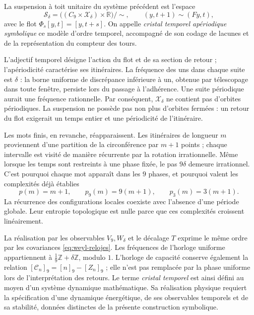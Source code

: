 \begin{definition}
\label{mono-ampl:def-cristal}
La suspension à toit unitaire du système précédent est l'espace
\[
 \mathcal S_\delta=
 \bigl((C_9\times\mathcal X_\delta)\times\mathbb R\bigr)/\sim,
 \qquad (y,t+1)\sim(Fy,t),
\]
avec le flot \(\Phi_s[y,t]=[y,t+s]\). On appelle \emph{cristal temporel
apériodique symbolique} ce modèle d'ordre temporel, accompagné de son
codage de lacunes et de la représentation du compteur des tours.
\end{definition}

L'adjectif temporel désigne l'action du flot et de sa section de retour ;
l'apériodicité caractérise ses itinéraires. La fréquence des uns dans chaque
suite est \(\delta\) : la borne uniforme de discrépance inférieure à un,
obtenue par télescopage dans toute fenêtre, persiste lors du passage à l'adhérence.
Une suite périodique aurait une fréquence rationnelle. Par conséquent,
\(\mathcal X_\delta\) ne contient pas d'orbites périodiques. La suspension
ne possède pas non plus d'orbites fermées : un retour du flot exigerait un temps
entier et une périodicité de l'itinéraire.

Les mots finis, en revanche, réapparaissent. Les itinéraires de longueur \(m\)
proviennent d'une partition de la circonférence par \(m+1\) points ; chaque
intervalle est visité de manière récurrente par la rotation irrationnelle. Même
lorsque les temps sont restreints à une phase fixée, le pas \(9\delta\) demeure
irrationnel. C'est pourquoi chaque mot apparaît dans les
\(9\) phases, et pourquoi valent les complexités déjà établies
\[
 p(m)=m+1,\qquad p_9(m)=9(m+1),\qquad p_3(m)=3(m+1).
\]
La récurrence des configurations locales coexiste avec l'absence d'une
période globale. Leur entropie topologique est nulle parce que ces complexités
croissent linéairement.

La réalisation par les observables \(V_9,W_\delta\) et le décalage
\(T\) exprime le même ordre par les covariances
\eqref{eq:weyl-relojes}. Les fréquences de l'horloge uniforme appartiennent à
\(\frac19\mathbb Z+\delta\mathbb Z\), modulo \(1\). L'horloge de
capacité conserve également la relation
\([\mathcal C_n]_9=[n]_9-[Z_n]_9\) ; elle n'est pas remplacée par la phase uniforme
lors de l'interprétation des retours. Le terme \emph{cristal temporel} est ainsi
défini au moyen d'un système dynamique mathématique. Sa réalisation physique
requiert la spécification d'une dynamique énergétique, de ses observables temporels
et de sa stabilité, données distinctes de la présente construction symbolique.

